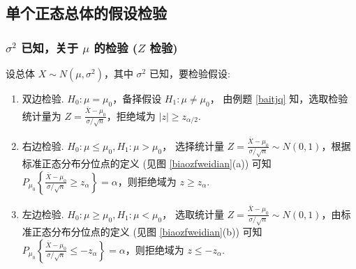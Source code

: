 \subsection{单个正态总体的假设检验}

\subsubsection{\texorpdfstring{$\sigma^2$}. 已知，关于 \texorpdfstring{$\mu$}. 的检验 (\texorpdfstring{$Z$}. 检验)}

设总体 $ X \sim N\left(\mu, \sigma^{2}\right)$，其中 $ \sigma^{2} $ 已知，要检验假设:
\begin{enumerate}[label=(\arabic{*})]
    \item 双边检验. $ H_{0}: \mu=\mu_{0} $，备择假设 $ H_{1}: \mu \neq \mu_{0} $，
          由例题 \ref{baitjq} 知，选取检验统计量为 $\displaystyle Z=\frac{\bar{X}-\mu_{0}}{\sigma / \sqrt{n}}$，拒绝域为 $ |z| \geqslant z_{\alpha / 2} .$
    \item 右边检验. $ H_{0}: \mu \leqslant \mu_{0}, H_{1}: \mu>\mu_{0} $，
          选择统计量 $\displaystyle Z=\frac{\bar{X}-\mu_{0}}{\sigma / \sqrt{n}} \sim N(0,1) $，根据标准正态分布分位点的定义 (见图 \ref{biaozfweidian}(a)) 可知 $\displaystyle P_{\mu_{0}}\left\{\frac{\bar{X}-\mu_{0}}{\sigma / \sqrt{n}} \geqslant z_{\alpha}\right\}=\alpha $，则拒绝域为 $ z \geqslant z_{\alpha} .$
    \item 左边检验. $ H_{0}: \mu \geqslant \mu_{0}, H_{1}: \mu<\mu_{0} $，
          选取统计量 $\displaystyle  Z=\frac{\bar{X}-\mu_{0}}{\sigma / \sqrt{n}} \sim N(0,1)$，由标准正态分布分位点的定义 (见图 \ref{biaozfweidian}(b)) 可知 $\displaystyle P_{\mu_{0}}\left\{\frac{\bar{X}-\mu_{0}}{\sigma / \sqrt{n}} \leqslant-z_{\alpha}\right\}=\alpha$，则拒绝域为 $ z \leqslant-z_{\alpha} .$
\end{enumerate}


